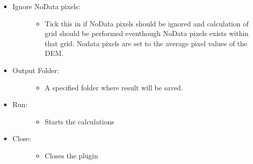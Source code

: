 \documentclass[letterpaper,10pt,english]{sphinxmanual}
\begin{document}
\begin{itemize}
\begin{description}
\begin{itemize}
\end{itemize}

\end{description}

\item {} \begin{description}
\item[{Ignore NoData pixels:}] \leavevmode\begin{itemize}
\item {} 
Tick this in if NoData pixels should be ignored and calculation of grid should be performed eventhough NoData pixels exists within that grid. Nodata pixels are set to the average pixel values of the DEM.

\end{itemize}

\end{description}

\item {} \begin{description}
\item[{Output Folder:}] \leavevmode\begin{itemize}
\item {} 
A specified folder where result will be saved.

\end{itemize}

\end{description}

\item {} \begin{description}
\item[{Run:}] \leavevmode\begin{itemize}
\item {} 
Starts the calculations

\end{itemize}

\end{description}

\item {} \begin{description}
\item[{Close:}] \leavevmode\begin{itemize}
\item {} 
Closes the plugin

\end{itemize}

\end{description}


\end{itemize}
\end{document}
